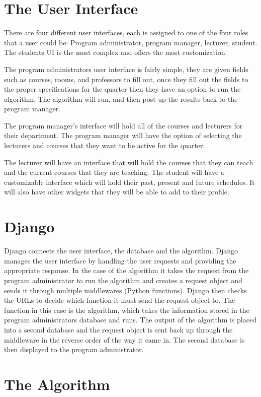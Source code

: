\documentclass[12pt,article]{memoir}
\begin{document}
\section{The User Interface}
There are four different user interfaces, each is assigned to one of the four roles that a user could be: Program administrator, program manager, lecturer, student. The students UI is the most complex and offers the most customization.

The program administrators user interface is fairly simple, they are given fields such as courses, rooms, and professors to fill out, once they fill out the fields to the proper specifications for the quarter then they have an option to run the algorithm. The algorithm will run, and then post up the results back to the program manager.

The program manager's interface will hold all of the courses and lecturers for their department. The program manager will have the option of selecting the lecturers and courses that they want to be active for the quarter.

The lecturer will have an interface that will hold the courses that they can teach and the current courses that they are teaching. 
The student will have a customizable interface which will hold their past, present and future schedules. It will also have other widgets that they will be able to add to their profile.
\section{Django}
Django connects the user interface, the database and the algorithm. Django manages the user interface by handling the user requests and providing the appropriate response. In the case of the algorithm it takes the request from the program administrator to run the algorithm and creates a request object and sends it through multiple middlewares (Python functions). Django then checks the URLs to decide which function it must send the request object to. The function in this case is the algorithm, which takes the information stored in the program administrators database and runs. The output of the algorithm is placed into a second database and the request object is sent back up through the middleware in the reverse order of the way it came in. The second database is then displayed to the program administrator.

\section{The Algorithm}
\end{document}
